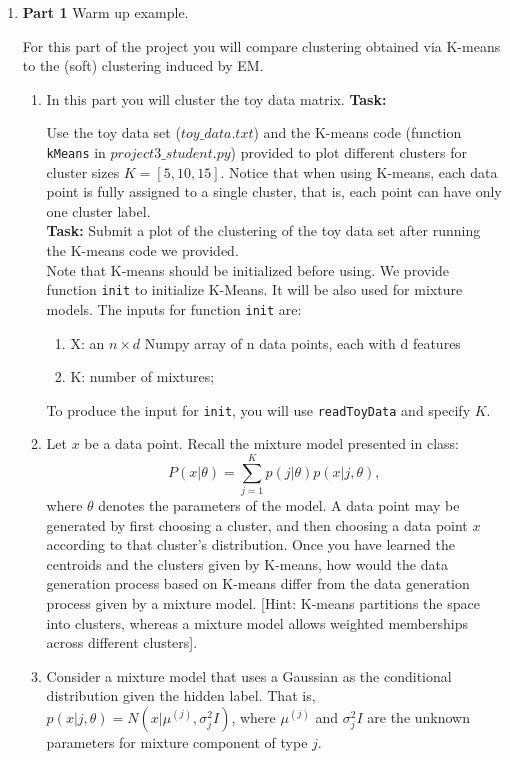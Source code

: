 \begin{enumerate}

\item {\bf Part 1} Warm up example.

For this part of the project you will compare clustering obtained via K-means to the (soft) clustering induced by EM.

\begin{enumerate}
  \item In this part you will cluster the toy data matrix.
  \textbf{Task:}
  
  Use the toy data set (\texttt{$toy\_data.txt$}) and the K-means code (function \texttt{kMeans} in \texttt{$project3\_student.py$}) provided to plot different clusters for cluster sizes $K = [5, 10, 15]$. Notice that when using K-means, each data point is fully assigned to a single cluster, that is, each point can have only one cluster label.\\
  \textbf{Task:} Submit a plot of the clustering of the toy data set after running the K-means code we provided.\\
  Note that K-means should be initialized before using. We provide function \texttt{init} to initialize K-Means. It will be also used for mixture models. The inputs for function \texttt{init} are:
  \begin{enumerate}
  \item X: an $n \times d$ Numpy array of n data points, each with d features
  \item K: number of mixtures;
  \end{enumerate}
  To produce the input for \texttt{init}, you will use \texttt{readToyData} and specify $K$. 

  \item Let $x$ be a data point. Recall the mixture model presented in class: $$P(x | \theta) = \sum^{K}_{j=1} p(j| \theta)p(x | j, \theta),$$ where $\theta$ denotes the parameters of the model. A data point may be generated by first choosing a cluster, and then choosing a data point $x$ according to that cluster's distribution. Once you have learned the centroids and the clusters given by K-means, how would the data generation process based on K-means differ from the data generation process given by a mixture model. [Hint: K-means partitions the space into clusters, whereas a mixture model allows weighted memberships across different clusters].
  \item Consider a mixture model that uses a Gaussian as the conditional distribution given the hidden label. That is, $p(x | j, \theta) = N(x | \mu^{(j)}, \sigma^2_{j} I)$, where $\mu^{(j)}$ and $\sigma^2_jI$ are the unknown parameters for mixture component of type $j$.


\end{enumerate}
\end{enumerate}
